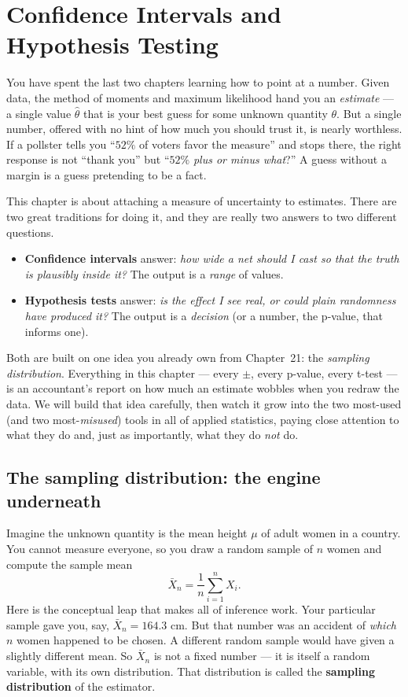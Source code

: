 \chapter{Confidence Intervals and Hypothesis Testing}

You have spent the last two chapters learning how to point at a number. Given data,
the method of moments and maximum likelihood hand you an \emph{estimate} --- a single
value $\hat\theta$ that is your best guess for some unknown quantity $\theta$. But a
single number, offered with no hint of how much you should trust it, is nearly
worthless. If a pollster tells you ``$52\%$ of voters favor the measure'' and stops
there, the right response is not ``thank you'' but ``$52\%$ \emph{plus or minus what}?''
A guess without a margin is a guess pretending to be a fact.

This chapter is about attaching a measure of uncertainty to estimates. There are two
great traditions for doing it, and they are really two answers to two different
questions.

\begin{itemize}
  \item \textbf{Confidence intervals} answer: \emph{how wide a net should I cast so that
  the truth is plausibly inside it?} The output is a \emph{range} of values.
  \item \textbf{Hypothesis tests} answer: \emph{is the effect I see real, or could plain
  randomness have produced it?} The output is a \emph{decision} (or a number, the
  p-value, that informs one).
\end{itemize}

Both are built on one idea you already own from Chapter~21: the \emph{sampling
distribution}. Everything in this chapter --- every $\pm$, every p-value, every t-test
--- is an accountant's report on how much an estimate wobbles when you redraw the
data. We will build that idea carefully, then watch it grow into the two most-used (and
two most-\emph{misused}) tools in all of applied statistics, paying close attention to
what they do and, just as importantly, what they do \emph{not} do.

\section{The sampling distribution: the engine underneath}
\label{ch32:sampling}

Imagine the unknown quantity is the mean height $\mu$ of adult women in a country. You
cannot measure everyone, so you draw a random sample of $n$ women and compute the
sample mean
\[
  \bar X_n = \frac{1}{n}\sum_{i=1}^n X_i .
\]
Here is the conceptual leap that makes all of inference work. Your particular sample
gave you, say, $\bar X_n = 164.3$ cm. But that number was an accident of \emph{which}
$n$ women happened to be chosen. A different random sample would have given a slightly
different mean. So $\bar X_n$ is not a fixed number --- it is itself a random variable,
with its own distribution. That distribution is called the \textbf{sampling
distribution} of the estimator.

